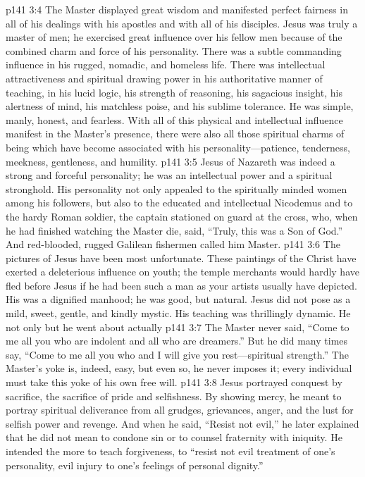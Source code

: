 \pc \vs p141 3:4 The Master displayed great wisdom and manifested perfect fairness in all of his dealings with his apostles and with all of his disciples. Jesus was truly a master of men; he exercised great influence over his fellow men because of the combined charm and force of his personality. There was a subtle commanding influence in his rugged, nomadic, and homeless life. There was intellectual attractiveness and spiritual drawing power in his authoritative manner of teaching, in his lucid logic, his strength of reasoning, his sagacious insight, his alertness of mind, his matchless poise, and his sublime tolerance. He was simple, manly, honest, and fearless. With all of this physical and intellectual influence manifest in the Master’s presence, there were also all those spiritual charms of being which have become associated with his personality---patience, tenderness, meekness, gentleness, and humility.
\vs p141 3:5 Jesus of Nazareth was indeed a strong and forceful personality; he was an intellectual power and a spiritual stronghold. His personality not only appealed to the spiritually minded women among his followers, but also to the educated and intellectual Nicodemus and to the hardy Roman soldier, the captain stationed on guard at the cross, who, when he had finished watching the Master die, said, “Truly, this was a Son of God.” And red\hyp{}blooded, rugged Galilean fishermen called him Master.\plusone
\vs p141 3:6 The pictures of Jesus have been most unfortunate. These paintings of the Christ have exerted a deleterious influence on youth; the temple merchants would hardly have fled before Jesus if he had been such a man as your artists usually have depicted. His was a dignified manhood; he was good, but natural. Jesus did not pose as a mild, sweet, gentle, and kindly mystic. His teaching was thrillingly dynamic. He not only  but he went about actually 
\vs p141 3:7 The Master never said, “Come to me all you who are indolent and all who are dreamers.” But he did many times say, \textcolor{ubdarkred}{“Come to me all you who  and I will give you rest---spiritual strength.”} The Master’s yoke is, indeed, easy, but even so, he never imposes it; every individual must take this yoke of his own free will.
\vs p141 3:8 Jesus portrayed conquest by sacrifice, the sacrifice of pride and selfishness. By showing mercy, he meant to portray spiritual deliverance from all grudges, grievances, anger, and the lust for selfish power and revenge. And when he said, \textcolor{ubdarkred}{“Resist not evil,”} he later explained that he did not mean to condone sin or to counsel fraternity with iniquity. He intended the more to teach forgiveness, to \textcolor{ubdarkred}{“resist not evil treatment of one’s personality, evil injury to one’s feelings of personal dignity.”}
